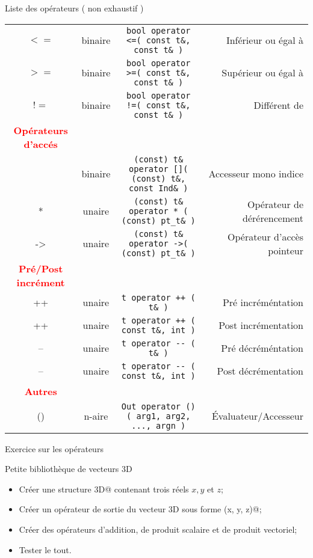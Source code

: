 \documentclass[handout,10pt]{beamer}
\begin{document}
\begin{frame}[fragile]{Liste des opérateurs ( non exhaustif )}
\begin{tabular}{cccr}
    $<=$ & binaire & \lstinline$bool operator <=( const t&, const t& )$ & Inférieur ou égal à \\
    $>=$ & binaire & \lstinline$bool operator >=( const t&, const t& )$ & Supérieur ou égal à \\
    $!=$ & binaire & \lstinline$bool operator !=( const t&, const t& )$ & Différent de \\
{\textcolor{red}{\bf Opérateurs d'accés}} & & &\\ \hline
    [] & binaire & \lstinline$(const) t& operator []( (const) t&, const Ind& )$ & Accesseur mono indice \\
    *  & unaire  & \lstinline$(const) t& operator * ( (const) pt_t& )$ & Opérateur de dérérencement     \\
    -> & unaire  & \lstinline$(const) t& operator ->( (const) pt_t& )$ & Opérateur d'accès pointeur     \\
{\textcolor{red}{\bf Pré/Post incrément}} & & &\\ \hline
    ++ & unaire  & \lstinline$t operator ++ ( t& )$ & Pré incréméntation \\
    ++ & unaire  & \lstinline$t operator ++ ( const t&, int )$ & Post incrémentation \\
    -- & unaire  & \lstinline$t operator -- ( t& )$ & Pré décréméntation \\
    -- & unaire  & \lstinline$t operator -- ( const t&, int )$ & Post décrémentation \\   
{\textcolor{red}{\bf Autres}} & & &\\ \hline
    () & n-aire & \lstinline$Out operator () ( arg1, arg2, ..., argn )$ & \'Evaluateur/Accesseur \\
\end{tabular}
\end{frame}

\begin{frame}[fragile]{Exercice sur les opérateurs}
\small

\begin{block}{Petite bibliothèque de vecteurs 3D}
\begin{itemize}
\item Créer une structure \verb@vecteur3D@ contenant trois réels $x,y$ et $z$;
\item Créer un opérateur de sortie du vecteur 3D sous forme \verb@(x, y, z)@;
\item Créer des opérateurs d'addition, de produit scalaire et de produit vectoriel; 
\item Tester le tout.
\end{itemize}
\end{block}

\end{frame}
\end{document}
